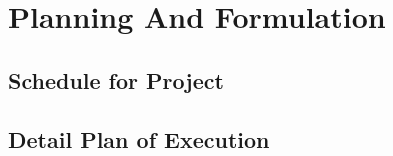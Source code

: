 \chapter{Planning And Formulation}
	

\section{Schedule for Project}


\section{Detail Plan of Execution}


